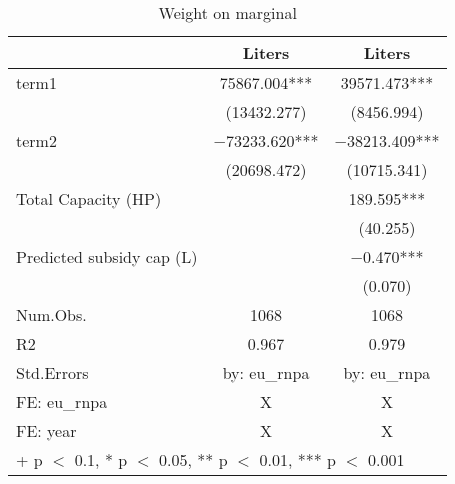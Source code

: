 \begin{table}

\caption{\label{tab:}Weight on marginal}
\centering
\begin{tabular}[t]{lcc}
\toprule
  & Liters & Liters \\
\midrule
term1 & \num{75867.004}*** & \num{39571.473}***\\
 & (\num{13432.277}) & (\num{8456.994})\\
term2 & \num{-73233.620}*** & \num{-38213.409}***\\
 & (\num{20698.472}) & (\num{10715.341})\\
Total Capacity (HP) &  & \num{189.595}***\\
 &  & (\num{40.255})\\
Predicted subsidy cap (L) &  & \num{-0.470}***\\
 &  & (\num{0.070})\\
\midrule
Num.Obs. & \num{1068} & \num{1068}\\
R2 & \num{0.967} & \num{0.979}\\
Std.Errors & by: eu\_rnpa & by: eu\_rnpa\\
FE: eu_rnpa & X & X\\
FE: year & X & X\\
\bottomrule
\multicolumn{3}{l}{\rule{0pt}{1em}+ p $<$ 0.1, * p $<$ 0.05, ** p $<$ 0.01, *** p $<$ 0.001}\\
\end{tabular}
\end{table}
